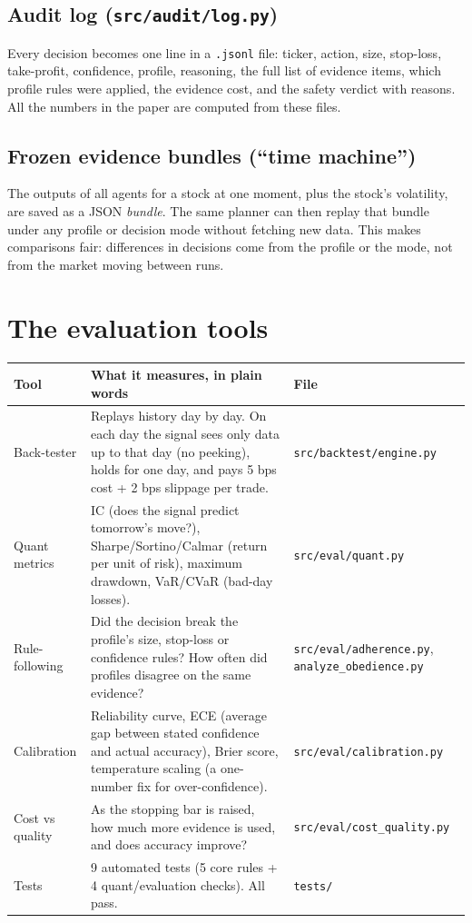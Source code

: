 \documentclass[10.5pt,a4paper]{article}
\newcommand{\file}[1]{\texttt{#1}}
\begin{document}
\subsection{Audit log (\file{src/audit/log.py})}
Every decision becomes one line in a \file{.jsonl} file: ticker, action, size, stop-loss, take-profit, confidence, profile, reasoning, the full list of evidence items, which profile rules were applied, the evidence cost, and the safety verdict with reasons. All the numbers in the paper are computed from these files.

\subsection{Frozen evidence bundles (``time machine'')}
The outputs of all agents for a stock at one moment, plus the stock's volatility, are saved as a JSON \emph{bundle}. The same planner can then replay that bundle under any profile or decision mode without fetching new data. This makes comparisons fair: differences in decisions come from the profile or the mode, not from the market moving between runs.

\section{The evaluation tools}

{\small
\begin{tabularx}{\linewidth}{L{2.6cm}YL{4.4cm}}
\toprule
\textbf{Tool} & \textbf{What it measures, in plain words} & \textbf{File} \\
\midrule
Back-tester & Replays history day by day. On each day the signal sees only data up to that day (no peeking), holds for one day, and pays 5 bps cost + 2 bps slippage per trade. & \file{src/backtest/engine.py} \\
Quant metrics & IC (does the signal predict tomorrow's move?), Sharpe/Sortino/Calmar (return per unit of risk), maximum drawdown, VaR/CVaR (bad-day losses). & \file{src/eval/quant.py} \\
Rule-following & Did the decision break the profile's size, stop-loss or confidence rules? How often did profiles disagree on the same evidence? & \file{src/eval/adherence.py}, \file{analyze\_obedience.py} \\
Calibration & Reliability curve, ECE (average gap between stated confidence and actual accuracy), Brier score, temperature scaling (a one-number fix for over-confidence). & \file{src/eval/calibration.py} \\
Cost vs quality & As the stopping bar is raised, how much more evidence is used, and does accuracy improve? & \file{src/eval/cost\_quality.py} \\
Tests & 9 automated tests (5 core rules + 4 quant/evaluation checks). All pass. & \file{tests/} \\
\bottomrule
\end{tabularx}}
\end{document}
